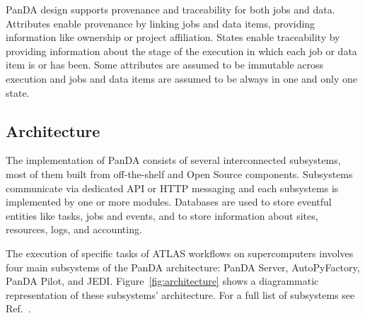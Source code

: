 PanDA design supports provenance and traceability for both jobs and data.
Attributes enable provenance by linking jobs and data items, providing
information like ownership or project affiliation. States enable traceability by
providing information about the stage of the execution in which each job or data
item is or has been. Some attributes are assumed to be immutable across
execution and jobs and data items are assumed to be always in one and only one
state.


\subsection{Architecture}
\label{ssec:panda_arch}

The implementation of PanDA consists of several interconnected subsystems, most
of them built from off-the-shelf and Open Source components. Subsystems
communicate via dedicated API or HTTP messaging and each subsystems is
implemented by one or more modules. Databases are used to store eventful
entities like tasks, jobs and events, and to store information about sites,
resources, logs, and accounting.

The execution of specific tasks of ATLAS workflows on supercomputers involves
four main subsystems of the PanDA architecture: PanDA Server, AutoPyFactory,
PanDA Pilot, and JEDI. Figure~\ref{fig:architecture} shows a diagrammatic
representation of these subsystems' architecture. For a full list of subsystems
see Ref.~\cite{panda-wiki_url}.



